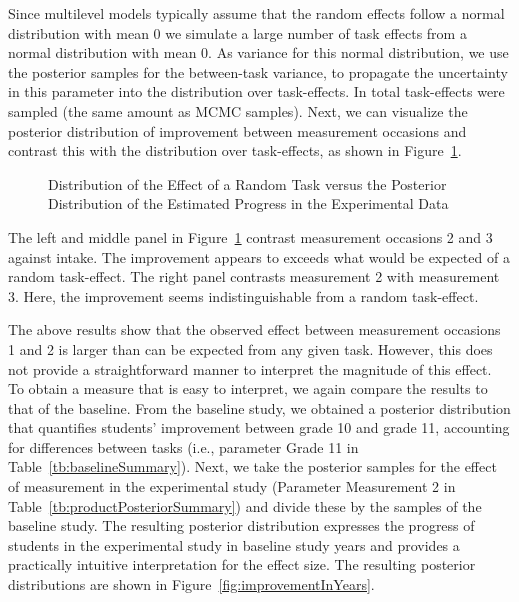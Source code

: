 \documentclass[man, floatsintext]{apa7}
\newenvironment{nscenter}
{\parskip=0pt\par\nopagebreak\centering}
{\par\noindent\ignorespacesafterend}
\newcommand\PlaceInsert[1]{%
	\smallskip%
	\begin{nscenter}
		\framebox{\Cref{#1} about here.}
	\end{nscenter}
	\smallskip%
}
\newcommand{\getValInt}[3]{%
	\pgfplotstablegetelem{#1}{#2}\of{#3}%
	\pgfmathprintnumber[fixed, fixed zerofill=false]{\pgfplotsretval}%
}
\begin{document}
Since multilevel models typically assume that the random effects follow a normal distribution with mean 0 we simulate a large number of task effects from a normal distribution with mean 0. As variance for this normal distribution, we use the posterior samples for the between-task variance, to propagate the uncertainty in this parameter into the distribution over task-effects.
In total \getValInt{0}{total}{\tbMCMCsettings} task-effects were sampled (the same amount as MCMC samples). Next, we can visualize the posterior distribution of improvement between measurement occasions and contrast this with the distribution over task-effects, as shown in Figure~\ref{fig:posteriorImprovement}.
\PlaceInsert{fig:posteriorImprovement}
\begin{figure}[!ht]
	\caption{Distribution of the Effect of a Random Task versus the Posterior Distribution of the Estimated Progress in the Experimental Data}
	\label{fig:posteriorImprovement}
\end{figure}

The left and middle panel in Figure~\ref{fig:posteriorImprovement} contrast measurement occasions 2 and 3 against intake.
The improvement appears to exceeds what would be expected of a random task-effect.
The right panel contrasts measurement 2 with measurement 3. Here, the improvement seems indistinguishable from a random task-effect.


The above results show that the observed effect between measurement occasions 1 and 2 is larger than can be expected from any given task.
However, this does not provide a straightforward manner to interpret the magnitude of this effect.
To obtain a measure that is easy to interpret, we again compare the results to that of the baseline.
From the baseline study, we obtained a posterior distribution that quantifies students' improvement between grade 10 and grade 11, accounting for differences between tasks (i.e., parameter Grade 11 in Table~\ref{tb:baselineSummary}).
Next, we take the posterior samples for the effect of measurement in the experimental study (Parameter Measurement 2 in Table~\ref{tb:productPosteriorSummary}) and divide these by the samples of the baseline study.
The resulting posterior distribution expresses the progress of students in the experimental study in baseline study years and provides a practically intuitive interpretation for the effect size.
The resulting posterior distributions are shown in Figure~\ref{fig:improvementInYears}.
\end{document}
